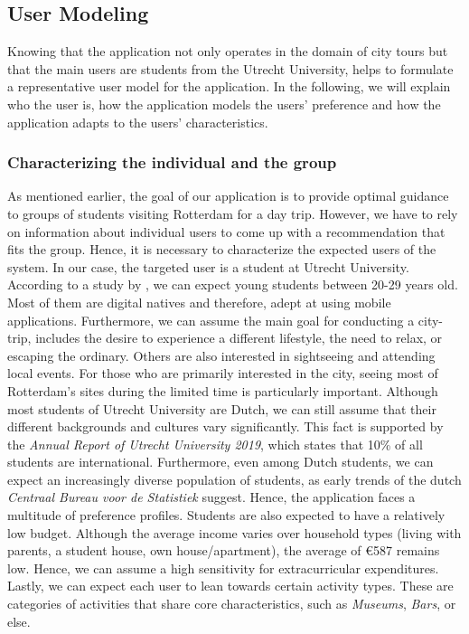 \documentclass[11pt,a4paper,oneside]{article}
\begin{document}
\subsection{User Modeling}
\label{sec:UM}
Knowing that the application not only operates in the domain of city tours but that the main users are students from the Utrecht University, helps to formulate a representative user model for the application. In the following, we will explain who the user is, how the application models the users' preference and how the application adapts to the users' characteristics. 

\subsubsection{Characterizing the individual and the group}
As mentioned earlier, the goal of our application is to provide optimal guidance to groups of students visiting Rotterdam for a day trip. However, we have to rely on information about individual users to come up with a recommendation that fits the group. Hence, it is necessary to characterize the expected users of the system. In our case, the targeted user is a student at Utrecht University. According to a study by \citeauthor{AgeAverage_students}, we can expect young students between 20-29 years old.\cite{AgeAverage_students} Most of them are digital natives and therefore, adept at using mobile applications.\cite{prensky_DigitalNativesDigital_2001a} Furthermore, we can assume the main goal for conducting a city-trip, includes the desire to experience a different lifestyle, the need to relax, or escaping the ordinary. Others are also interested in sightseeing and attending local events.\cite{rita2019millennials} For those who are primarily interested in the city, seeing most of Rotterdam's sites during the limited time is particularly important. Although most students of Utrecht University are Dutch, we can still assume that their different backgrounds and cultures vary significantly. This fact is supported by the \emph{Annual Report of Utrecht University 2019}, which states that 10\% of all students are international.\cite{utrecht_UniversiteitUtrecht_2019} Furthermore, even among Dutch students, we can expect an increasingly diverse population of students, as early trends of the dutch \emph{Centraal Bureau voor de Statistiek} suggest.\cite{theovanmiltenburg_AllochtonenHogerOnderwijs_2007} Hence, the application faces a multitude of preference profiles. Students are also expected to have a relatively low budget. Although the average income varies over household types (living with parents, a student house, own house/apartment), the average of €587 remains low.\cite{kobus_OwnershipOncampusUse_2013} Hence, we can assume a high sensitivity for extracurricular expenditures. Lastly, we can expect each user to lean towards certain activity types. These are categories of activities that share core characteristics, such as \emph{Museums}, \emph{Bars}, or else. 
\end{document}
